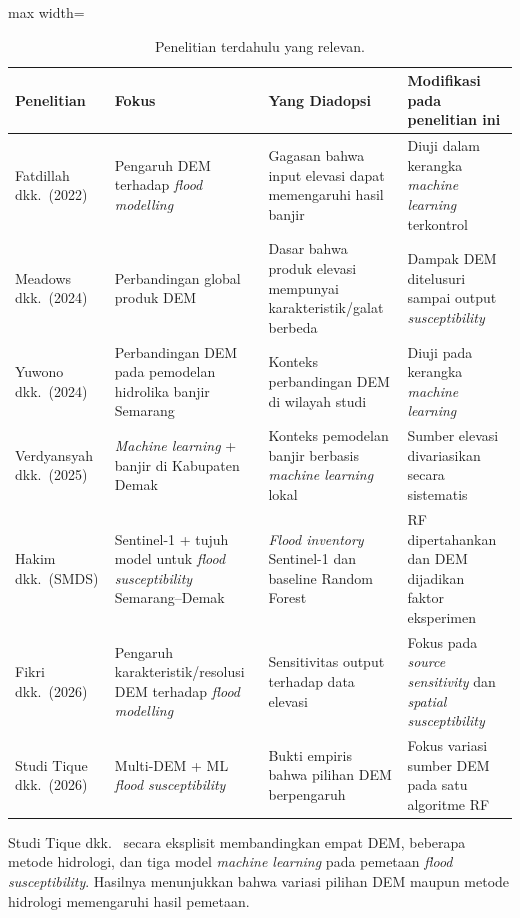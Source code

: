 \documentclass[12pt]{article}
\begin{document}
\begin{table}[ht]
\centering
\caption{Penelitian terdahulu yang relevan.}
\label{tab:prior}
\begin{adjustbox}{max width=\textwidth}
\begin{tabular}{>{\raggedright}p{2.6cm}
                >{\raggedright}p{3.6cm}
                >{\raggedright}p{3.8cm}
                >{\raggedright\arraybackslash}p{3.8cm}}
\toprule
\textbf{Penelitian} & \textbf{Fokus} & \textbf{Yang Diadopsi} & \textbf{Modifikasi pada penelitian ini} \\
\midrule
Fatdillah dkk.\ (2022) \cite{fatdillah2022} & Pengaruh DEM terhadap \textit{flood modelling} & Gagasan bahwa input elevasi dapat memengaruhi hasil banjir & Diuji dalam kerangka \textit{machine learning} terkontrol \\
Meadows dkk.\ (2024) \cite{meadows2024} & Perbandingan global produk DEM & Dasar bahwa produk elevasi mempunyai karakteristik/galat berbeda & Dampak DEM ditelusuri sampai output \textit{susceptibility} \\
Yuwono dkk.\ (2024) \cite{yuwono2024} & Perbandingan DEM pada pemodelan hidrolika banjir Semarang & Konteks perbandingan DEM di wilayah studi & Diuji pada kerangka \textit{machine learning} \\
Verdyansyah dkk.\ (2025) \cite{verdyansyah2025} & \textit{Machine learning} + banjir di Kabupaten Demak & Konteks pemodelan banjir berbasis \textit{machine learning} lokal & Sumber elevasi divariasikan secara sistematis \\
Hakim dkk.\ (SMDS) \cite{hakim2026} & Sentinel-1 + tujuh model untuk \textit{flood susceptibility} Semarang--Demak & \textit{Flood inventory} Sentinel-1 dan baseline Random Forest & RF dipertahankan dan DEM dijadikan faktor eksperimen \\
Fikri dkk.\ (2026) \cite{fikri2026} & Pengaruh karakteristik/resolusi DEM terhadap \textit{flood modelling} & Sensitivitas output terhadap data elevasi & Fokus pada \textit{source sensitivity} dan \textit{spatial susceptibility} \\
Studi Tique dkk.\ (2026) \cite{Tique2026} & Multi-DEM + ML \textit{flood susceptibility} & Bukti empiris bahwa pilihan DEM berpengaruh & Fokus variasi sumber DEM pada satu algoritme RF \\
\bottomrule
\end{tabular}
\end{adjustbox}
\end{table}

Studi Tique dkk.\ \cite{Tique2026} secara eksplisit membandingkan empat DEM,
beberapa metode hidrologi, dan tiga model \textit{machine learning} pada
pemetaan \textit{flood susceptibility}. Hasilnya menunjukkan bahwa variasi
pilihan DEM maupun metode hidrologi memengaruhi hasil pemetaan.
\end{document}
